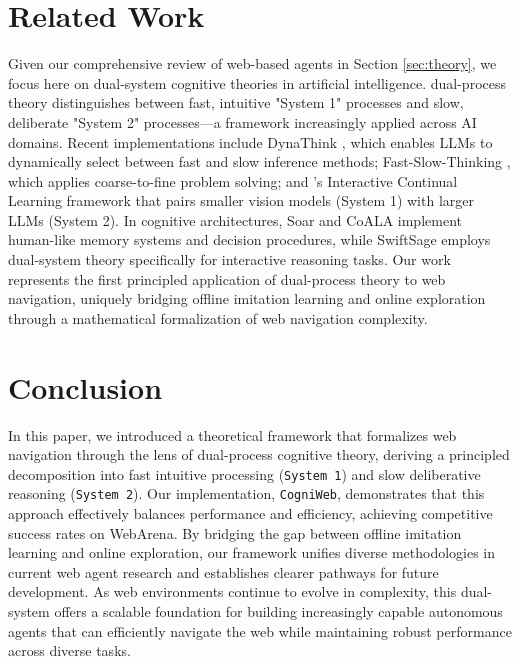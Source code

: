 \documentclass{article}
\begin{document}
\section{Related Work}
Given our comprehensive review of web-based agents in Section \ref{sec:theory}, we focus here on dual-system cognitive theories in artificial intelligence. \citet{kahneman2011thinking} dual-process theory distinguishes between fast, intuitive "System 1" processes and slow, deliberate "System 2" processes—a framework increasingly applied across AI domains. Recent implementations include DynaThink \citep{pan2024dynathinkfastslowdynamic}, which enables LLMs to dynamically select between fast and slow inference methods; Fast-Slow-Thinking \citep{sun2025fastslowthinkingcomplextasksolving}, which applies coarse-to-fine problem solving; and \citet{Qi_2024_CVPR}'s Interactive Continual Learning framework that pairs smaller vision models (System 1) with larger LLMs (System 2). In cognitive architectures, Soar \citep{laird2019soar} and CoALA \citep{sumers2023cognitive} implement human-like memory systems and decision procedures, while SwiftSage \citep{lin2023swiftsage} employs dual-system theory specifically for interactive reasoning tasks. Our work represents the first principled application of dual-process theory to web navigation, uniquely bridging offline imitation learning and online exploration through a mathematical formalization of web navigation complexity.

\section{Conclusion}
In this paper, we introduced a theoretical framework that formalizes web navigation through the lens of dual-process cognitive theory, deriving a principled decomposition into fast intuitive processing (\texttt{System 1}) and slow deliberative reasoning (\texttt{System 2}). Our implementation, \texttt{CogniWeb}, demonstrates that this approach effectively balances performance and efficiency, achieving competitive success rates on WebArena. By bridging the gap between offline imitation learning and online exploration, our framework unifies diverse methodologies in current web agent research and establishes clearer pathways for future development. As web environments continue to evolve in complexity, this dual-system offers a scalable foundation for building increasingly capable autonomous agents that can efficiently navigate the web while maintaining robust performance across diverse tasks.
\end{document}
